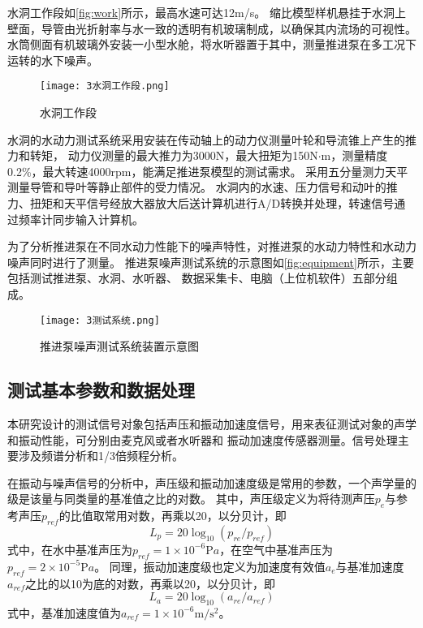 水洞工作段如\autoref{fig:work}所示，最高水速可达12m/s。
缩比模型样机悬挂于水洞上壁面，导管由光折射率与水一致的透明有机玻璃制成，以确保其内流场的可视性。
水筒侧面有机玻璃外安装一小型水舱，将水听器置于其中，测量推进泵在多工况下运转的水下噪声。
\begin{figure}[htbp]
    \centering
    \texttt{[image: 3水洞工作段.png]}
    \caption{\label{fig:work}水洞工作段}
\end{figure}

水洞的水动力测试系统采用安装在传动轴上的动力仪测量叶轮和导流锥上产生的推力和转矩，
动力仪测量的最大推力为3000N，最大扭矩为150N$\cdot$m，测量精度0.2\%，最大转速4000rpm，能满足推进泵模型的测试需求。
采用五分量测力天平测量导管和导叶等静止部件的受力情况。
水洞内的水速、压力信号和动叶的推力、扭矩和天平信号经放大器放大后送计算机进行A/D转换并处理，转速信号通过频率计同步输入计算机。

为了分析推进泵在不同水动力性能下的噪声特性，对推进泵的水动力特性和水动力噪声同时进行了测量。
推进泵噪声测试系统的示意图如\autoref{fig:equipment}所示，主要包括测试推进泵、水洞、水听器、
数据采集卡、电脑（上位机软件）五部分组成。
\begin{figure}[htbp]
    \centering
    \texttt{[image: 3测试系统.png]}
    \caption{\label{fig:equipment}推进泵噪声测试系统装置示意图}
\end{figure}

\subsection{测试基本参数和数据处理}
本研究设计的测试信号对象包括声压和振动加速度信号，用来表征测试对象的声学和振动性能，可分别由麦克风或者水听器和
振动加速度传感器测量。信号处理主要涉及频谱分析和1/3倍频程分析。

在振动与噪声信号的分析中，声压级和振动加速度级是常用的参数，一个声学量的级是该量与同类量的基准值之比的对数。
其中，声压级定义为将待测声压$p_e$与参考声压$p_{ref}$的比值取常用对数，再乘以20，以分贝计，即
\begin{equation}
    \label{equ:p}
    L_{p} = 20\log_{10}{\left(p_{re}/p_{ref}\right )}
\end{equation}
式中，在水中基准声压为$p_{ref}= 1\times 10^{-6} \mathrm{P} a$，在空气中基准声压为$p_{ref}= 2\times 10^{-5} \mathrm{P} a$。
同理，振动加速度级也定义为加速度有效值$a_e$与基准加速度$a_{ref}$之比的以10为底的对数，再乘以20，以分贝计，即
\begin{equation}
    \label{equ:a}
    L_{a} = 20\log_{10}{\left(a_{re}/a_{ref}\right )}
\end{equation}
式中，基准加速度值为$a_{ref}= 1\times 10^{-6} \mathrm{m/s^2} $。

